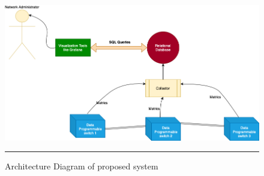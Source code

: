 \begin{figure}[htbp]
	\centering
		\includegraphics[width=1.0\columnwidth]{Figures/ArchitectureDiagram.png}
		\rule{35em}{0.5pt}
	\caption[Architecture Diagram]{Architecture Diagram of proposed system}
	\label{fig:link_utilization_under}
\end{figure}